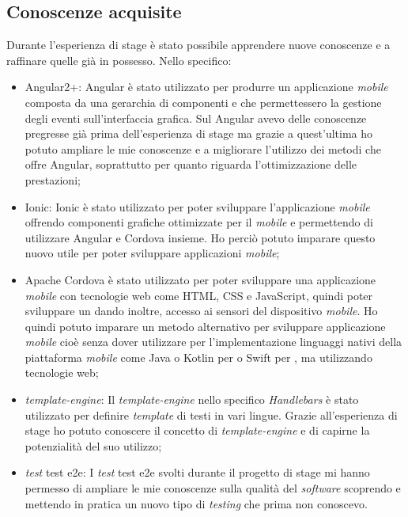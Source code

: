 \subsection{Conoscenze acquisite}
Durante l'esperienza di stage è stato possibile apprendere nuove conoscenze e a raffinare quelle già in possesso. Nello specifico:
\begin{itemize}
	\item {} Angular2+: Angular è stato utilizzato per produrre un applicazione \emph{mobile} composta da una gerarchia di componenti e che permettessero la gestione degli eventi sull'interfaccia grafica. Sul  Angular avevo delle conoscenze pregresse già prima dell'esperienza di stage ma grazie a quest'ultima ho potuto ampliare le mie conoscenze e a migliorare l'utilizzo dei metodi che offre Angular, soprattutto per quanto riguarda l'ottimizzazione delle prestazioni;
	\item {} Ionic: Ionic è stato utilizzato per poter sviluppare l'applicazione \emph{mobile} offrendo componenti grafiche ottimizzate per il \emph{mobile} e permettendo di utilizzare Angular e Cordova insieme. Ho perciò potuto imparare questo nuovo  utile per poter sviluppare applicazioni \emph{mobile};
	\item  {} Apache Cordova è stato utilizzato per poter sviluppare una applicazione \emph{mobile} con tecnologie web come \gls{HTML}, \gls{CSS} e JavaScript, quindi poter sviluppare un  dando inoltre, accesso ai sensori del dispositivo \emph{mobile}. Ho quindi potuto imparare un metodo alternativo per sviluppare applicazione \emph{mobile} cioè senza dover utilizzare per l'implementazione linguaggi nativi della piattaforma \emph{mobile} come Java o Kotlin per  o Swift per , ma utilizzando tecnologie web;
	\item \emph{template-engine}: Il \emph{template-engine} nello specifico \emph{Handlebars} è stato utilizzato per definire \emph{template} di testi in vari lingue. Grazie all'esperienza di stage ho potuto conoscere il concetto di \emph{template-engine} e di capirne la potenzialità del suo utilizzo;
	\item \emph{test} \gls{test e2e}: I \emph{test} \gls{test e2e} svolti durante il progetto di stage mi hanno permesso di ampliare le mie conoscenze sulla qualità del \emph{software} scoprendo e mettendo in pratica un nuovo tipo di \emph{testing} che prima non conoscevo.
\end{itemize}
